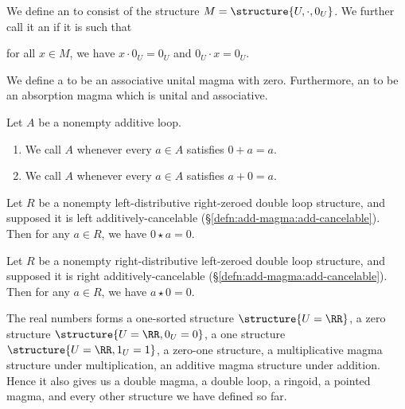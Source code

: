 \begin{definition}
We define an  to consist of the structure
$M=\structure{U,\cdot,0_{U}}$. We further call it an 
if it is such that
\begin{itemize}
 for all $x\in M$, we have
  $x\cdot0_{U}=0_{U}$ and $0_{U}\cdot x=0_{U}$.
\end{itemize}
We define a  to be an associative unital
magma with zero. Furthermore, an  to be an
absorption magma which is unital and associative.
\end{definition}

\begin{definition}\label{defn:add-loop:zeroed}
Let $A$ be a nonempty additive loop.
\begin{enumerate}
\item{} We call $A$  whenever every $a\in A$ satisfies $0+a=a$.
\item{} We call $A$  whenever every $a\in A$ satisfies $a+0=a$.
\end{enumerate}
\end{definition}

\begin{theorem}
Let $R$ be a nonempty left-distributive right-zeroed double loop structure, and
supposed it is left additively-cancelable {\rm(\S\ref{defn:add-magma:add-cancelable})}.
Then for any $a\in R$, we have $0\star a=0$.
\end{theorem}

\begin{theorem}
Let $R$ be a nonempty right-distributive left-zeroed double loop structure, and
supposed it is right additively-cancelable {\rm(\S\ref{defn:add-magma:add-cancelable})}.
Then for any $a\in R$, we have $a\star 0=0$.
\end{theorem}

\begin{example}
The real numbers forms a one-sorted structure $\structure{U=\RR}$,
a zero structure $\structure{U=\RR,0_{U}=0}$, a one structure
$\structure{U=\RR,1_{U}=1}$, a zero-one structure, a multiplicative magma
structure under multiplication, an additive magma structure under
addition. Hence it also gives us a double magma, a double loop, a ringoid,
a pointed magma, and every other structure we have defined so far.
\end{example}

